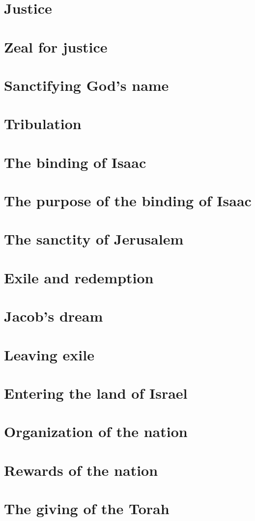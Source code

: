 \documentclass[11pt, a5paper, twoside, chapterprefix, openany]{scrbook}
\begin{document}
\chapter{Justice}
\chapter{Zeal for justice}
\chapter{Sanctifying God’s name}
\chapter{Tribulation}
\chapter{The binding of Isaac}
\chapter{The purpose of the binding of Isaac}
\chapter{The sanctity of Jerusalem}
\chapter{Exile and redemption}
\chapter{Jacob’s dream}
\chapter{Leaving exile}
\chapter{Entering the land of Israel}
\chapter{Organization of the nation}
\chapter{Rewards of the nation}
\chapter{The giving of the Torah}
\end{document}
